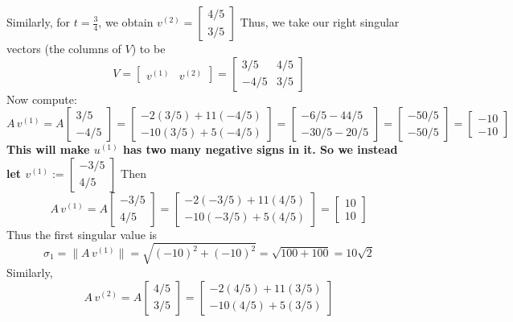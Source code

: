 \documentclass[lang=cn,11pt]{elegantbook}
\begin{document}
\begin{solution}
Similarly, for \(t=\frac{3}{4}\), we obtain $v^{(2)}=\begin{bmatrix} 4/5 \\ 3/5 \end{bmatrix}$
Thus, we take our right singular vectors (the columns of \(V\)) to be
\[
V=\begin{bmatrix} v^{(1)} & v^{(2)} \end{bmatrix}
=\begin{bmatrix} 3/5 & 4/5 \\ -4/5 & 3/5 \end{bmatrix}
\]Now compute:
\[
A\,v^{(1)}=A\begin{bmatrix} 3/5 \\ -4/5 \end{bmatrix}=
\begin{bmatrix} -2(3/5)+11(-4/5)\\ -10(3/5)+5(-4/5) \end{bmatrix}
=\begin{bmatrix} -6/5-44/5 \\ -30/5-20/5 \end{bmatrix}
=\begin{bmatrix} -50/5 \\ -50/5 \end{bmatrix}
=\begin{bmatrix} -10 \\ -10 \end{bmatrix}
\]
\textbf{This will make $u^{(1)}$ has two many negative signs in it. So we instead let $v^{(1)}:= \begin{bmatrix} -3/5 \\ 4/5 \end{bmatrix}$}
Then 
\[
A\,v^{(1)}=A\begin{bmatrix} -3/5 \\ 4/5 \end{bmatrix}=
\begin{bmatrix} -2(-3/5)+11(4/5)\\ -10(-3/5)+5(4/5) \end{bmatrix}
=\begin{bmatrix} 10 \\ 10 \end{bmatrix}
\]
Thus the first singular value is
\[
\sigma_1=\|A\,v^{(1)}\|=\sqrt{(-10)^2+(-10)^2}=\sqrt{100+100}=10\sqrt2
\]
Similarly,
\[
A\,v^{(2)}=A\begin{bmatrix} 4/5 \\ 3/5 \end{bmatrix}=
\begin{bmatrix} -2(4/5)+11(3/5)\\ -10(4/5)+5(3/5) \end{bmatrix}
\]
\end{solution}
\end{document}
